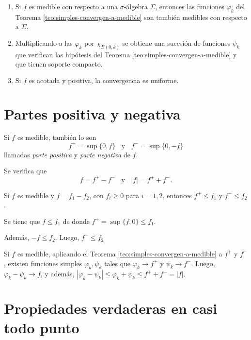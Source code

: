 \begin{observacion}{}
\begin{enumerate}
    \item Si $f$ es medible con respecto a una $\sigma$-\'algebra $\Sigma$, entonces las funciones $\varphi_k$ del Teorema \ref{teo:simples-convergen-a-medible} son tambi\'en medibles con respecto a $\Sigma$.
    \item Multiplicando a las $\varphi_k$ por $\chi_{B(0,k)}$ se obtiene una sucesi\'on de  funciones $\psi_k$ que verifican las hip\'otesis del Teorema \ref{teo:simples-convergen-a-medible} y que tienen soporte compacto.
    \item Si $f$ es acotada y positiva,  la convergencia es uniforme.
\end{enumerate}
\end{observacion}

\section{Partes positiva y negativa}

Si $f$ es medible, tambi\'en lo son 
\[
f^+=\sup\{0,f \}\;\;\mbox{ y }\;\;f^{-}=\sup\{0,-f\}
\]
llamadas \emph{parte positiva} y \emph{parte negativa} de $f$.

Se verifica que 
\[
f=f^{+}-f^{-}\;\;\mbox{ y }\;\; |f|=f^{+}+f^{-}.
\]

\begin{teorema}{}
Si $f$ es medible y $f=f_1-f_2$, con $f_i\geq 0$ para $i=1,2$, entonces
$f^{+}\leq f_1$ y $f^{-}\leq f_2$.
\end{teorema}

\begin{demo}
Se tiene que $f\leq f_1$ de donde $f^+=\sup\{ f,0\}\leq f_1$. 

Adem\'as, $-f \leq f_2$. Luego, $f^{-}\leq f_2$
\end{demo}

Si $f$ es medible,  aplicando el Teorema \ref{teo:simples-convergen-a-medible} a $f^+$ y $f^{-}$, 
existen funciones simples $\varphi_k,\psi_k$ tales que $\varphi_k \to f^+$
y $\psi_k \to f^{-}$. Luego, 
$\varphi_k - \psi_k \to f$, y adem\'as, $|\varphi_k-\psi_k|\leq \varphi_k+\psi_k \leq f^{+}+f^{-}=|f|$.

\section{Propiedades verdaderas en casi todo punto}

